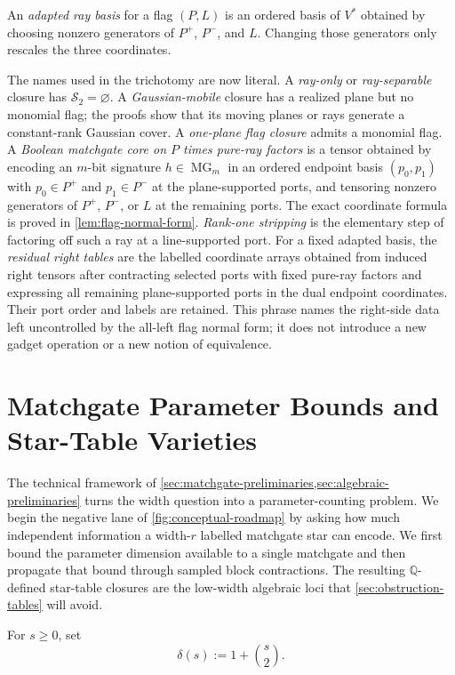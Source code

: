 \documentclass[11pt]{article}
\theoremstyle{definition}
\theoremstyle{remark}
\newcommand{\Q}{\mathbb Q}
\newcommand{\MG}{\operatorname{MG}}
\begin{document}
An \emph{adapted ray basis} for a flag $(P,L)$ is an ordered basis of
$V^*$ obtained by choosing nonzero generators of $P^+$, $P^-$, and $L$.
Changing those generators only rescales the three coordinates.

The names used in the trichotomy are now literal.  A \emph{ray-only} or
\emph{ray-separable} closure has $\mathcal S_2=\varnothing$.  A
\emph{Gaussian-mobile} closure has a realized plane but no monomial flag;
the proofs show that its moving planes or rays generate a constant-rank
Gaussian cover.  A \emph{one-plane flag closure} admits a monomial flag.
A \emph{Boolean matchgate core on $P$ times pure-ray factors} is a tensor
obtained by encoding an $m$-bit signature $h\in\MG_m$ in an ordered endpoint
basis $(p_0,p_1)$ with $p_0\in P^+$ and $p_1\in P^-$ at the plane-supported
ports, and tensoring nonzero generators of
$P^+$, $P^-$, or $L$ at the remaining ports.  The exact coordinate formula
is proved in \cref{lem:flag-normal-form}.  \emph{Rank-one stripping} is the
elementary step of factoring off such a ray at a line-supported port.
For a fixed adapted basis, the \emph{residual right tables} are the labelled
coordinate arrays obtained from induced right tensors after contracting
selected ports with fixed pure-ray factors and expressing all remaining
plane-supported ports in the dual endpoint coordinates.  Their port order
and labels are retained.  This phrase names the right-side data left
uncontrolled by the all-left flag normal form; it does not introduce a new
gadget operation or a new notion of equivalence.

\section{Matchgate Parameter Bounds and Star-Table Varieties}
\label{sec:matchgate-varieties}

The technical framework of
\cref{sec:matchgate-preliminaries,sec:algebraic-preliminaries}
turns the width question into a parameter-counting problem.  We begin the
negative lane of \cref{fig:conceptual-roadmap} by asking how much independent
information a width-$r$ labelled matchgate star can encode.  We first bound
the parameter dimension available to a single matchgate and then propagate
that bound through sampled block contractions.  The resulting
$\Q$-defined star-table closures are the low-width algebraic loci that
\cref{sec:obstruction-tables} will avoid.

For $s\ge0$, set
\[
  \delta(s):=1+\binom{s}{2}.
\]
\end{document}
